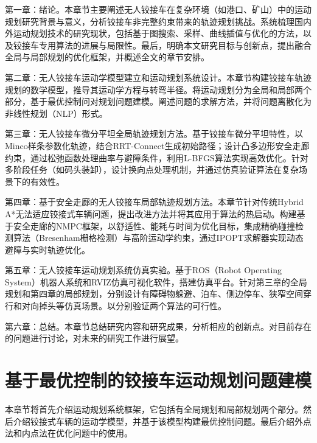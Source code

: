 \documentclass[master,academic]{ysuthesis} %
\begin{document}
	第一章：绪论。本章节主要阐述无人铰接车在复杂环境（如港口、矿山）中的运动规划研究背景与意义，分析铰接车非完整约束带来的轨迹规划挑战。系统梳理国内外运动规划技术的研究现状，包括基于图搜索、采样、曲线插值与优化的方法，以及铰接车专用算法的进展与局限性。最后，明确本文研究目标与创新点，提出融合全局与局部规划的优化框架，并概述全文的章节安排。

	第二章：无人铰接车运动学模型建立和运动规划系统设计。本章节构建铰接车轨迹规划的数学模型，推导其运动学方程与转弯半径。将运动规划分为全局和局部两个部分，基于最优控制问对规划问题建模。阐述问题的求解方法，并将问题离散化为非线性规划（NLP）形式。

	第三章：无人铰接车微分平坦全局轨迹规划方法​。基于铰接车微分平坦特性，以Minco样条参数化轨迹，结合RRT-Connect生成初始路径；设计凸多边形安全走廊约束，通过松弛函数处理曲率与避障条件，利用L-BFGS算法实现高效优化。针对多阶段任务（如码头装卸），设计换向点处理机制，并通过仿真验证算法在复杂场景下的有效性。

	第四章：基于安全走廊的无人铰接车局部轨迹规划方法​。本章节针对传统Hybrid A*无法适应铰接式车辆问题，提出改进方法并将其应用于算法的热启动。构建基于安全走廊的NMPC框架，以舒适性、能耗与时间为优化目标，集成精确碰撞检测算法（Bresenham栅格检测）与高阶运动学约束，通过IPOPT求解器实现动态避障与实时轨迹优化。

	第五章：无人铰接车运动规划系统仿真实验​。基于ROS（Robot Operating System）机器人系统和RVIZ仿真可视化软件，搭建仿真平台。针对第三章的全局规划和第四章的局部规划，分别设计有障碍物躲避、泊车、侧边停车、狭窄空间穿行和对向掉头等仿真场景。以分别验证两个算法的可行性。

	第六章：总结​。本章节总结研究内容和研究成果，分析相应的创新点。对目前存在的问题进行讨论，对未来的研究工作进行展望。

	\chapter{基于最优控制的铰接车运动规划问题建模}
	本章节将首先介绍运动规划系统框架，它包括有全局规划和局部规划两个部分。然后介绍铰接式车辆的运动学模型，并基于该模型构建最优控制问题。最后介绍外点法和内点法在优化问题中的使用。
\end{document}

